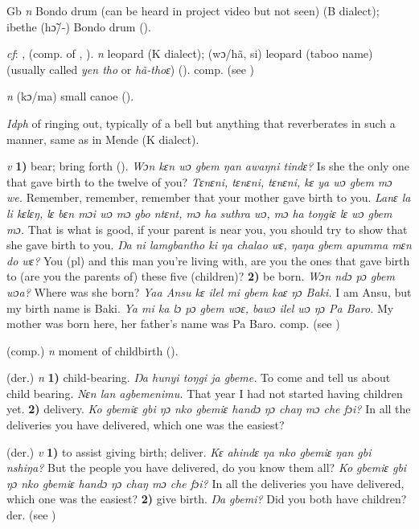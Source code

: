 \begin{letter}{Gb}
 \textit{n} Bondo drum (can be heard in project video but not seen) (B dialect); ibethe (hɔ̃/-) Bondo drum (\citealt{Pichl1967}).

 \textit{cf}: ,  (comp. of , ). \textit{n} leopard (K dialect); (wɔ/hã, si) leopard (taboo name) (usually called \textit{yen tho} or \textit{hã-thoɛ}) (\citealt{Pichl1967}). comp.  (see ) 

 \textit{n} (kɔ/ma) small canoe (\citealt{Pichl1967}). 

 \textit{Idph} of ringing out, typically of a bell but anything that reverberates in such a manner, same as in Mende (K dialect). 

 \textit{v} \textbf{1)} bear; bring forth (\citealt{Pichl1967}). \textit{Wɔn kɛn wɔ gbem ŋan awaŋni tindɛ?} Is she the only one that gave birth to the twelve of you? \textit{Tɛnɛni, tɛnɛni, tɛnɛni, kɛ ya wɔ gbem mɔ we.} Remember, remember, remember that your mother gave birth to you. \textit{Lanɛ la li kɛlɛŋ, lɛ bɛn mɔi wɔ mɔ gbo ntɛnt, mɔ ha suthra wɔ, mɔ ha toŋgiɛ lɛ wɔ gbem mɔ.} That is what is good, if your parent is near you, you should try to show that she gave birth to you. \textit{Ŋa ni lamgbantho ki ŋa chalao wɛ, ŋaŋa gbem apumma mɛn do wɛ?} You (pl) and this man you're living with, are you the ones that gave birth to (are you the parents of) these five (children)? \textbf{2)} be born. \textit{Wɔn ndɔ pɔ gbem wɔa?} Where was she born? \textit{Yaa Ansu kɛ ilel mi gbem kaɛ ŋɔ Baki.} I am Ansu, but my birth name is Baki. \textit{Ya mi ka lɔ pɔ gbem wɔɛ, bawɔ ilel wɔ ŋɔ Pa Baro.} My mother was born here, her father's name was Pa Baro. comp.  (see ) 

 (comp.) \textit{n} moment of childbirth (\citealt{Pichl1967}). 

 (der.) \textit{n} \textbf{1)} child-bearing. \textit{Ŋa hunyi toŋgi ja gbeme.} To come and tell us about child bearing. \textit{Nɛn lan agbemenimu.} That year I had not started having children yet. \textbf{2)} delivery. \textit{Ko gbemiɛ gbi ŋɔ nko gbemiɛ handɔ ŋɔ chaŋ mɔ che fɔi?} In all the deliveries you have delivered, which one was the easiest?

 (der.) \textit{v} \textbf{1)} to assist giving birth; deliver. \textit{Kɛ ahindɛ ŋa nko gbemiɛ ŋan gbi nshiŋa?} But the people you have delivered, do you know them all? \textit{Ko gbemiɛ gbi ŋɔ nko gbemiɛ handɔ ŋɔ chaŋ mɔ che fɔi?} In all the deliveries you have delivered, which one was the easiest? \textbf{2)} give birth. \textit{Ŋa gbemi?} Did you both have children? der.  (see )


\end{letter}
